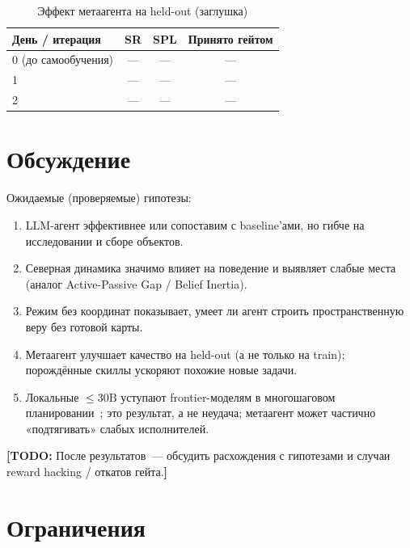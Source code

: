 \documentclass[11pt,a4paper]{article}
\newcommand{\todo}[1]{\textcolor{red!70!black}{\textbf{[TODO:} #1\textbf{]}}}
\begin{document}
\begin{table}[ht]
\centering
\caption{Эффект метаагента на held-out (заглушка)}
\label{tab:meta}
\begin{tabular}{lccc}
\toprule
День / итерация & SR & SPL & Принято гейтом \\
\midrule
0 (до самообучения) & --- & --- & --- \\
1 & --- & --- & --- \\
2 & --- & --- & --- \\
\bottomrule
\end{tabular}
\end{table}

\section{Обсуждение}
\label{sec:discussion}

Ожидаемые (проверяемые) гипотезы:
\begin{enumerate}[leftmargin=*]
  \item LLM-агент эффективнее или сопоставим с baseline'ами, но гибче
        на исследовании и сборе объектов.
  \item Северная динамика значимо влияет на поведение и выявляет слабые места
        (аналог Active-Passive Gap / Belief Inertia).
  \item Режим без координат показывает, умеет ли агент строить пространственную
        веру без готовой карты.
  \item Метаагент улучшает качество на held-out (а не только на train);
        порождённые скиллы ускоряют похожие новые задачи.
  \item Локальные \(\le 30\mathrm{B}\) уступают frontier-моделям в многошаговом
        планировании~\cite{liu2023agentbench}; это результат, а не неудача;
        метаагент может частично «подтягивать» слабых исполнителей.
\end{enumerate}

\todo{После результатов~--- обсудить расхождения с гипотезами и случаи
reward hacking / откатов гейта.}

\section{Ограничения}
\label{sec:limitations}
\end{document}

